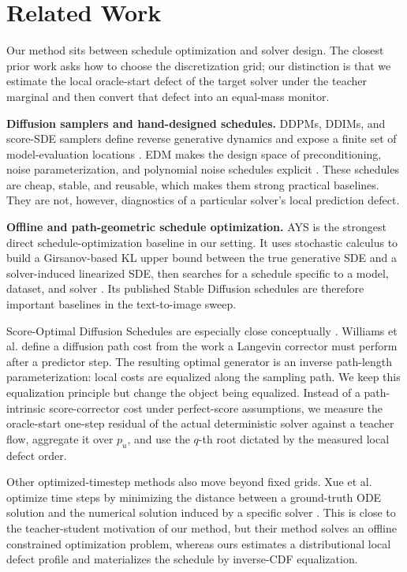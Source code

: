 \section{Related Work}
\label{sec:related-work}

Our method sits between schedule optimization and solver design. The closest
prior work asks how to choose the discretization grid; our distinction is that
we estimate the local oracle-start defect of the target solver under the
teacher marginal and then convert that defect into an equal-mass monitor.

\textbf{Diffusion samplers and hand-designed schedules.}
DDPMs, DDIMs, and score-SDE samplers define reverse generative dynamics and
expose a finite set of model-evaluation locations
\citep{ho2020ddpm,song2022ddim,song2021sde}. EDM makes the design space of
preconditioning, noise parameterization, and polynomial noise schedules explicit
\citep{karras2022edm}. These schedules are cheap, stable, and reusable, which
makes them strong practical baselines. They are not, however, diagnostics of a
particular solver's local prediction defect.

\textbf{Offline and path-geometric schedule optimization.}
AYS is the strongest direct schedule-optimization baseline in our setting. It
uses stochastic calculus to build a Girsanov-based KL upper bound between the
true generative SDE and a solver-induced linearized SDE, then searches for a
schedule specific to a model, dataset, and solver \citep{sabour2024ays}. Its
published Stable Diffusion schedules are therefore important baselines in the
text-to-image sweep.

Score-Optimal Diffusion Schedules are especially close conceptually
\citep{williams2024scoreoptimal}. Williams et al. define a diffusion path cost
from the work a Langevin corrector must perform after a predictor step. The
resulting optimal generator is an inverse path-length parameterization: local
costs are equalized along the sampling path. We keep this equalization
principle but change the object being equalized. Instead of a path-intrinsic
score-corrector cost under perfect-score assumptions, we measure the
oracle-start one-step residual of the actual deterministic solver against a
teacher flow, aggregate it over $p_u$, and use the $q$-th root dictated by the
measured local defect order.

Other optimized-timestep methods also move beyond fixed grids. Xue et al.
optimize time steps by minimizing the distance between a ground-truth ODE
solution and the numerical solution induced by a specific solver
\citep{xue2024optimizedtimesteps}. This is close to the teacher-student
motivation of our method, but their method solves an offline constrained
optimization problem, whereas ours estimates a distributional local defect
profile and materializes the schedule by inverse-CDF equalization.

